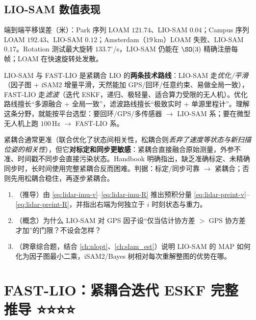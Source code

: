 \subsection{LIO-SAM 数值表现}
端到端平移误差（米）\cite{shan2020liosam}：Park 序列 LOAM $121.74$、LIO-SAM $0.04$；Campus 序列 LOAM $192.43$、LIO-SAM $0.12$；Amsterdam（$19$\,km）LOAM 失败、LIO-SAM $0.17$。Rotation 测试最大旋转 $133.7^\circ$/s，LIO-SAM 仍能在 $\SO(3)$ 精确注册每帧；LOAM 在快速旋转处发散。

\begin{insight}
LIO-SAM 与 FAST-LIO 是紧耦合 LIO 的\textbf{两条技术路线}：LIO-SAM 走\emph{优化/平滑}（因子图 + iSAM2 增量平滑，天然能加 GPS/回环/任意约束、易做全局一致），FAST-LIO 走\emph{滤波}（迭代 ESKF，递归、极轻量、适合算力受限的无人机）。优化路线擅长“多源融合 + 全局一致”，滤波路线擅长“极致实时 + 单源里程计”。理解这条分野，就能按平台选型：要回环/GPS/多传感器 $\to$ LIO-SAM 系；要在微型无人机上跑 $100$\,Hz $\to$ FAST-LIO 系。
\end{insight}

\begin{pitfall}
紧耦合通常更准（联合优化了状态间相关性，松耦合则\emph{丢弃了速度等状态与新扫描位姿的相关性}），但它\textbf{对标定和同步更敏感}：紧耦合直接融合原始测量，外参不准、时间戳不同步会直接污染状态。Handbook 明确指出，缺乏准确标定、未精确同步时，长时间使用完整紧耦合反而困难\cite{carlone2026handbook}。判据：标定/同步可靠 $\to$ 紧耦合；否则先用松耦合稳住，再逐步紧耦合。
\end{pitfall}

\begin{practice}
\begin{enumerate}
  \item （推导）由 \cref{eq:lidar-imu-v}–\cref{eq:lidar-imu-R} 推出预积分量 \cref{eq:lidar-preint-v}–\cref{eq:lidar-preint-R}，并指出右端为何独立于 $i$ 时刻状态与重力。
  \item （概念）为什么 LIO-SAM 对 GPS 因子设“仅当估计协方差 $>$ GPS 协方差才加”的门限？不设会怎样？
  \item （跨章综合题，结合 \cref{ch:nlopt}、\cref{ch:slam_est}）说明 LIO-SAM 的 MAP 如何化为因子图最小二乘，iSAM2/Bayes 树相对每次重解整图的优势在哪。
\end{enumerate}
\end{practice}

\section{FAST-LIO：紧耦合迭代 ESKF 完整推导 ⭐⭐⭐⭐}
\label{sec:lidar-fastlio}

